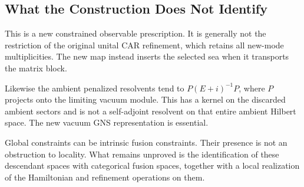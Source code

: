 \subsection{What the Construction Does Not Identify}

This is a new constrained observable prescription. It is generally not
the restriction of the original unital CAR refinement, which retains all
new-mode multiplicities. The new map instead inserts the selected sea
when it transports the matrix block.

Likewise the ambient penalized resolvents tend to
$P(E+i)^{-1}P$, where $P$ projects onto the limiting vacuum module. This
has a kernel on the discarded ambient sectors and is not a self-adjoint
resolvent on that entire ambient Hilbert space. The new vacuum GNS
representation is essential.

Global constraints can be intrinsic fusion constraints. Their presence is
not an obstruction to locality. What remains unproved is the identification
of these descendant spaces with categorical fusion spaces, together with a
local realization of the Hamiltonian and refinement operations on them.
